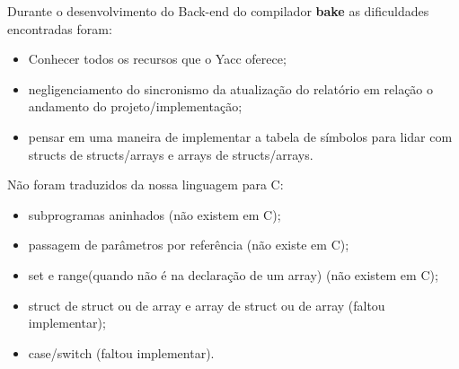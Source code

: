 Durante o desenvolvimento do Back-end do compilador \textbf{bake} as dificuldades encontradas foram:

\begin{itemize}
\item Conhecer todos os recursos que o Yacc oferece;
\item negligenciamento do sincronismo da atualização do relatório em relação o andamento do projeto/implementação;
\item pensar em uma maneira de implementar a tabela de símbolos para lidar com structs de structs/arrays e arrays de structs/arrays.
\end{itemize}

Não foram traduzidos da nossa linguagem para C:
\begin{itemize}
    \item subprogramas aninhados (não existem em C);
    \item passagem de parâmetros por referência (não existe em C);
    \item set e range(quando não é na declaração de um array) (não existem em C);
    \item struct de struct ou de array e array de struct ou de array (faltou implementar);
    \item case/switch (faltou implementar).
\end{itemize}
